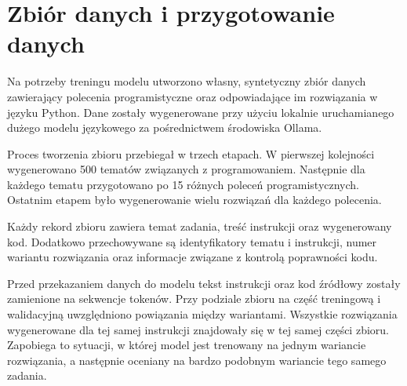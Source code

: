 \section{Zbiór danych i przygotowanie danych}
\label{sec:dane}

Na potrzeby treningu modelu utworzono własny, syntetyczny zbiór danych zawierający polecenia programistyczne oraz odpowiadające im rozwiązania w języku Python. Dane zostały wygenerowane przy użyciu lokalnie uruchamianego dużego modelu językowego za pośrednictwem środowiska Ollama.

Proces tworzenia zbioru przebiegał w trzech etapach. W pierwszej kolejności wygenerowano 500 tematów związanych z programowaniem. Następnie dla każdego tematu przygotowano po 15 różnych poleceń programistycznych. Ostatnim etapem było wygenerowanie wielu rozwiązań dla każdego polecenia.

Każdy rekord zbioru zawiera temat zadania, treść instrukcji oraz wygenerowany kod. Dodatkowo przechowywane są identyfikatory tematu i instrukcji, numer wariantu rozwiązania oraz informacje związane z kontrolą poprawności kodu.




Przed przekazaniem danych do modelu tekst instrukcji oraz kod źródłowy zostały zamienione na sekwencje tokenów. Przy podziale zbioru na część treningową i walidacyjną uwzględniono powiązania między wariantami. Wszystkie rozwiązania wygenerowane dla tej samej instrukcji znajdowały się w tej samej części zbioru. Zapobiega to sytuacji, w której model jest trenowany na jednym wariancie rozwiązania, a następnie oceniany na bardzo podobnym wariancie tego samego zadania.


%
%
%
%
%
